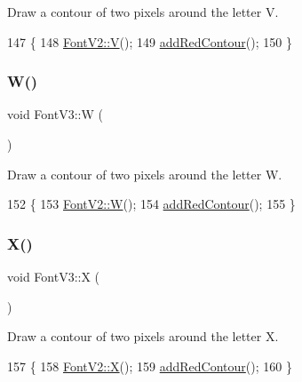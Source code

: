 Draw a contour of two pixels around the letter V. 


\begin{DoxyCode}
147                \{
148     \mbox{\hyperlink{class_font_v2_a58980cf432ef60e1a765b1033da310b4}{FontV2::V}}();
149     \mbox{\hyperlink{class_font_v3_a639f1eac0eb6724463813270f47e2696}{addRedContour}}();
150 \}
\end{DoxyCode}
\mbox{\label{class_font_v3_afc703bc984103ca4bb4837b063445df4}} 
\subsubsection{\texorpdfstring{W()}{W()}}
{\footnotesize\ttfamily void Font\+V3\+::W (\begin{DoxyParamCaption}{ }\end{DoxyParamCaption})}



Draw a contour of two pixels around the letter W. 


\begin{DoxyCode}
152                \{
153     \mbox{\hyperlink{class_font_v2_abb6c182459f9a1a20c4d6a85d09b1b1d}{FontV2::W}}();
154     \mbox{\hyperlink{class_font_v3_a639f1eac0eb6724463813270f47e2696}{addRedContour}}();
155 \}
\end{DoxyCode}
\mbox{\label{class_font_v3_ad5c0bbbf9004db4f4d55a337952c1ced}} 
\subsubsection{\texorpdfstring{X()}{X()}}
{\footnotesize\ttfamily void Font\+V3\+::X (\begin{DoxyParamCaption}{ }\end{DoxyParamCaption})}



Draw a contour of two pixels around the letter X. 


\begin{DoxyCode}
157                \{
158     \mbox{\hyperlink{class_font_v2_a63545ba2652b9559d8d171c5bd37fbea}{FontV2::X}}();
159     \mbox{\hyperlink{class_font_v3_a639f1eac0eb6724463813270f47e2696}{addRedContour}}();
160 \}
\end{DoxyCode}
\mbox{\label{class_font_v3_a7043ca0266db871020697b760598f569}} 
